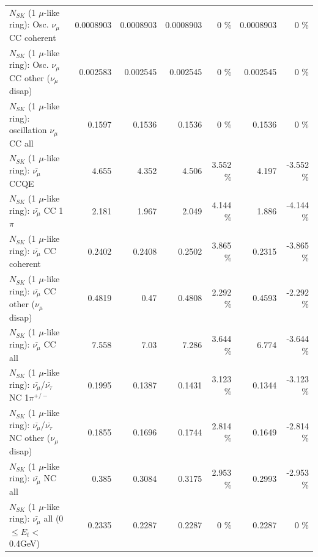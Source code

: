 \begin{table}
\begin{tabular}{| l | r | r | r  r | r  r |}
                        $N_{SK}$ (1 $\mu$-like ring): Osc. $\nu_\mu$ CC coherent &       0.0008903 &       0.0008903 &       0.0008903 &        0 \%  &       0.0008903 &        0 \%  \\ 
         $N_{SK}$ (1 $\mu$-like ring): Osc. $\nu_\mu$ CC other ($\nu_\mu$ disap) &        0.002583 &        0.002545 &        0.002545 &        0 \%  &        0.002545 &        0 \%  \\ 
                      $N_{SK}$ (1 $\mu$-like ring): oscillation $\nu_\mu$ CC all &          0.1597 &          0.1536 &          0.1536 &        0 \%  &          0.1536 &        0 \%  \\ 
\hline
\hline
                              $N_{SK}$ (1 $\mu$-like ring): $\bar{\nu_\mu}$ CCQE &           4.655 &           4.352 &           4.506 &    3.552 \%  &           4.197 &   -3.552 \%  \\ 
                         $N_{SK}$ (1 $\mu$-like ring): $\bar{\nu_\mu}$ CC 1$\pi$ &           2.181 &           1.967 &           2.049 &    4.144 \%  &           1.886 &   -4.144 \%  \\ 
                       $N_{SK}$ (1 $\mu$-like ring): $\bar{\nu_\mu}$ CC coherent &          0.2402 &          0.2408 &          0.2502 &    3.865 \%  &          0.2315 &   -3.865 \%  \\ 
        $N_{SK}$ (1 $\mu$-like ring): $\bar{\nu_\mu}$ CC other ($\nu_\mu$ disap) &          0.4819 &            0.47 &          0.4808 &    2.292 \%  &          0.4593 &   -2.292 \%  \\ 
                          $N_{SK}$ (1 $\mu$-like ring): $\bar{\nu_{\mu}}$ CC all &           7.558 &            7.03 &           7.286 &    3.644 \%  &           6.774 &   -3.644 \%  \\ 
\hline
  $N_{SK}$ (1 $\mu$-like ring): $\bar{\nu_\mu}$/$\bar{\nu_\tau}$ NC 1$\pi^{+/-}$ &          0.1995 &          0.1387 &          0.1431 &    3.123 \%  &          0.1344 &   -3.123 \%  \\ 
$N_{SK}$ (1 $\mu$-like ring): $\bar{\nu_\mu}$/$\bar{\nu_\tau}$ NC other ($\nu_\mu$ disap) &          0.1855 &          0.1696 &          0.1744 &    2.814 \%  &          0.1649 &   -2.814 \%  \\ 
                          $N_{SK}$ (1 $\mu$-like ring): $\bar{\nu_{\mu}}$ NC all &           0.385 &          0.3084 &          0.3175 &    2.953 \%  &          0.2993 &   -2.953 \%  \\ 
\hline
   $N_{SK}$ (1 $\mu$-like ring): $\bar{\nu_{\mu}}$ all (0 $\leq E_{t} <$ 0.4GeV) &          0.2335 &          0.2287 &          0.2287 &        0 \%  &          0.2287 &        0 \%  \\ 

\end{tabular}
\end{table}
